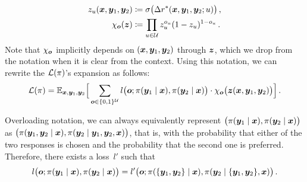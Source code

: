 \begin{proofEnd}
\begin{proofEnd}
\begin{align*}
            z_u({\bm{x}}, {\bm{y}}_1, {\bm{y}}_2) &\coloneqq \sigma\big(\Delta r^*({\bm{x}}, {\bm{y}}_1, {\bm{y}}_2; u)\big) \,, \\
            \chi_{\bm{o}}({\bm{z}}) &\coloneqq \prod_{u \in {\mathcal{U}}} z_u^{o_u} (1 - z_u)^{1 - o_u}
            \,.
        \end{align*}
        Note that $\chi_{\bm{o}}$ implicitly depends on $({\bm{x}}, {\bm{y}}_1, {\bm{y}}_2)$ through ${\bm{z}}$, which we drop from the notation when it is clear from the context. Using this notation, we can rewrite the ${\mathcal{L}}(\pi)$'s expansion as follows:
        \begin{equation}
        \label{eq:_proof_l_expansion}
            {\mathcal{L}}(\pi) = \mathbb{E}_{{\bm{x}}, {\bm{y}}_1, {\bm{y}}_2}\Big[
            \sum_{{\bm{o}} \in \{0, 1\}^{{\mathcal{U}}}}
            l\big({\bm{o}}; \pi({\bm{y}}_1 \mid {\bm{x}}), \pi({\bm{y}}_2 \mid {\bm{x}})\big) \cdot
            \chi_{\bm{o}}\big({\bm{z}}({\bm{x}}, {\bm{y}}_1, {\bm{y}}_2)\big)
            \Big]
            \,.
        \end{equation}
    
        Overloading notation, we can always equivalently represent $\big(\pi({\bm{y}}_1 \mid {\bm{x}}), \pi({\bm{y}}_2 \mid {\bm{x}})\big)$ as $\big(\pi({{\bm{y}}_1, {\bm{y}}_2} \mid {\bm{x}}), \pi({\bm{y}}_2 \mid {{\bm{y}}_1, {\bm{y}}_2}, {\bm{x}})\big)$, that is, with the probability that either of the two responses is chosen and the probability that the second one is preferred. Therefore, there exists a loss~$l'$ such that
        \begin{equation*}
            l\big({\bm{o}}; \pi({\bm{y}}_1 \mid {\bm{x}}), \pi({\bm{y}}_2 \mid {\bm{x}})\big) = 
            l'\big({\bm{o}}; \pi(\{{\bm{y}}_1, {\bm{y}}_2\} \mid {\bm{x}}), \pi({\bm{y}}_2 \mid \{{\bm{y}}_1, {\bm{y}}_2\}, {\bm{x}})\big)
            \,.
        \end{equation*}
        

\end{proofEnd}
\end{proofEnd}
